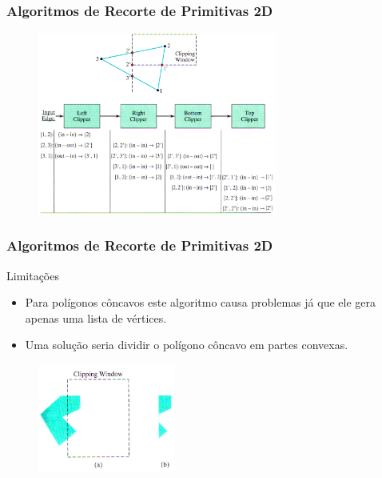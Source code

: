 \documentclass{beamer}
\begin{document}
\begin{frame}
\frametitle{Algoritmos de Recorte de Primitivas 2D}

	\begin{figure}[!h]
			\begin{center}
				\includegraphics[width=0.7\textwidth]{Figures/RecPolAlg}
			\end{center}
	\end{figure}
\end{frame}


\begin{frame}
\frametitle{Algoritmos de Recorte de Primitivas 2D}

	\begin{block}{Limitações}
		\begin{itemize}
			\item Para polígonos côncavos este algoritmo causa problemas já que ele gera apenas uma lista de vértices.
			\item Uma solução seria dividir o polígono côncavo em partes convexas.	 
		\end{itemize}
	\end{block}
	
	\begin{figure}[!h]
			\begin{center}
				\includegraphics[width=0.4\textwidth]{Figures/PolCon}
			\end{center}
	\end{figure}
\end{frame}
\end{document}
